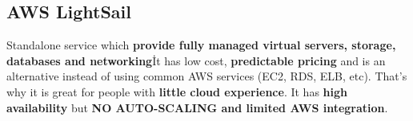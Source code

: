 \subsection{AWS LightSail}\label{subsec:aws-lightsail}
Standalone service which \textbf{provide fully managed virtual servers, storage, databases and networking}\.
It has low cost, \textbf{predictable pricing} and is an alternative instead of using common AWS services (EC2, RDS, ELB, etc).
That's why it is great for people with \textbf{little cloud experience}.
It has \textbf{high availability} but \textbf{NO AUTO-SCALING and limited AWS integration}.